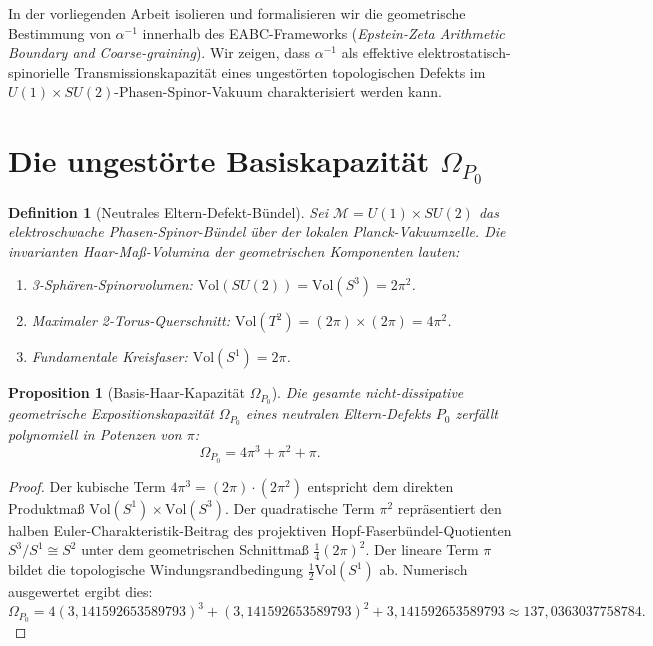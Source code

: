 \documentclass[11pt,a4paper]{article}
\newtheorem{proposition}[theorem]{Proposition}
\newtheorem{definition}[theorem]{Definition}
\begin{document}
In der vorliegenden Arbeit isolieren und formalisieren wir die geometrische Bestimmung von $\alpha^{-1}$ innerhalb des EABC-Frameworks (\textit{Epstein-Zeta Arithmetic Boundary and Coarse-graining}). Wir zeigen, dass $\alpha^{-1}$ als effektive elektrostatisch-spinorielle Transmissionskapazität eines ungestörten topologischen Defekts im $U(1) \times SU(2)$-Phasen-Spinor-Vakuum charakterisiert werden kann.

\section{Die ungestörte Basiskapazität \texorpdfstring{$\Omega_{P_0}$}{Omega P0}}\label{sec:base}

\begin{definition}[Neutrales Eltern-Defekt-Bündel]
Sei $\mathcal{M} = U(1) \times SU(2)$ das elektroschwache Phasen-Spinor-Bündel über der lokalen Planck-Vakuumzelle. Die invarianten Haar-Maß-Volumina der geometrischen Komponenten lauten:
\begin{enumerate}\itemsep1pt \parskip0pt 
    \item 3-Sphären-Spinorvolumen: $\mathrm{Vol}(SU(2)) = \mathrm{Vol}(S^3) = 2\pi^2$.
    \item Maximaler 2-Torus-Querschnitt: $\mathrm{Vol}(T^2) = (2\pi) \times (2\pi) = 4\pi^2$.
    \item Fundamentale Kreisfaser: $\mathrm{Vol}(S^1) = 2\pi$.
\end{enumerate}
\end{definition}

\begin{proposition}[Basis-Haar-Kapazität $\Omega_{P_0}$]
Die gesamte nicht-dissipative geometrische Expositionskapazität $\Omega_{P_0}$ eines neutralen Eltern-Defekts $P_0$ zerfällt polynomiell in Potenzen von $\pi$:
\begin{equation}
\Omega_{P_0} = 4\pi^3 + \pi^2 + \pi.
\label{eq:base_omega}
\end{equation}
\end{proposition}

\begin{proof}
Der kubische Term $4\pi^3 = (2\pi) \cdot (2\pi^2)$ entspricht dem direkten Produktmaß $\mathrm{Vol}(S^1) \times \mathrm{Vol}(S^3)$. Der quadratische Term $\pi^2$ repräsentiert den halben Euler-Charakteristik-Beitrag des projektiven Hopf-Faserbündel-Quotienten $S^3 / S^1 \cong S^2$ unter dem geometrischen Schnittmaß $\frac{1}{4}(2\pi)^2$. Der lineare Term $\pi$ bildet die topologische Windungsrandbedingung $\frac{1}{2}\mathrm{Vol}(S^1)$ ab. Numerisch ausgewertet ergibt dies:
\begin{equation}
\Omega_{P_0} = 4(3{,}141592653589793)^3 + (3{,}141592653589793)^2 + 3{,}141592653589793 \approx 137{,}0363037758784.
\end{equation}
\end{proof}
\end{document}
